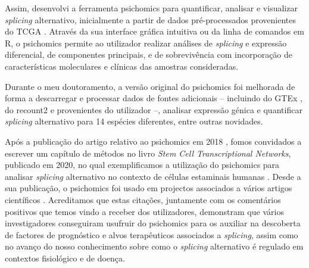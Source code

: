 Assim, desenvolvi a ferramenta psichomics para quantificar, analisar e visualizar \emph{splicing} alternativo, inicialmente a partir de dados pré-processados provenientes do TCGA \cite{chang:2013ww}. Através da sua interface gráfica intuitiva ou da linha de comandos em R, o psichomics permite ao utilizador realizar análises de \emph{splicing} e expressão diferencial, de componentes principais, e de sobrevivência com incorporação de características moleculares e clínicas das amostras consideradas.

Durante o meu doutoramento, a versão original do psichomics foi melhorada de forma a descarregar e processar dados de fontes adicionais -- incluindo do GTEx \cite{lonsdale:2013uo}, do recount2 \cite{collado-torres:2017uw} e provenientes do utilizador --, analisar expressão génica e quantificar \emph{splicing} alternativo para 14 espécies diferentes, entre outras novidades.


Após a publicação do artigo relativo ao psichomics em 2018 \cite{saraiva-agostinho:2018uq}, fomos convidados a escrever um capítulo de métodos no livro \emph{Stem Cell Transcriptional Networks}, publicado em 2020, no qual exemplificamos a utilização do psichomics para analisar \emph{splicing} alternativo no contexto de células estaminais humanas \cite{saraiva-agostinho:2020wz}. Desde a sua publicação, o psichomics foi usado em projectos associados a vários artigos científicos \cite{coomer:2019wz,baeza-centurion:2019tb,munkley:2019wr,kumar:2022aa}. Acreditamos que estas citações, juntamente com os comentários positivos que temos vindo a receber dos utilizadores, demonstram que vários investigadores conseguiram usufruir do psichomics para os auxiliar na descoberta de factores de prognóstico e alvos terapêuticos associados a \emph{splicing}, assim como no avanço do nosso conhecimento sobre como o \emph{splicing} alternativo é regulado em contextos fisiológico e de doença.

